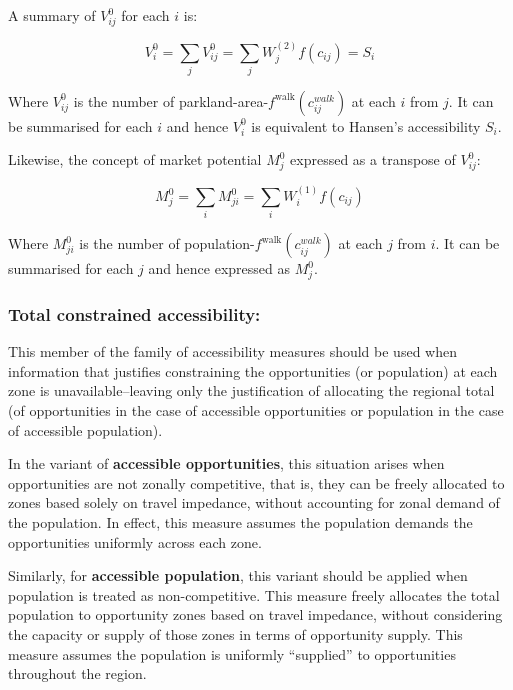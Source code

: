 \documentclass[
11pt, %
oneside, %
english, %
singlespacing, %
]{macthesis} %
\begin{document}
A summary of \(V_{ij}^0\) for each \(i\) is:

\begin{equation}
\label{eq:unconstrained-accessibility-park}
V^0_i = \sum_j V^0_{ij} = \sum_j W^{(2)}_j f(c_{ij}) = S_i
\end{equation} 

Where \(V^0_{ij}\) is the number of parkland-area-\(f^\text{walk}(c^{walk}_{ij})\) at each \(i\) from \(j\). It can be summarised for each \(i\) and hence \(V^0_i\) is equivalent to Hansen's accessibility \(S_i\).

Likewise, the concept of market potential \(M_j^0\) expressed as a transpose of \(V^0_{ij}\):

\begin{equation}
\label{eq:unconstrained-market-park}
M_j^0 = \sum_i M^0_{ji} = \sum_i W_i^{(1)} f(c_{ij})
\end{equation} 

Where \(M^0_{ji}\) is the number of population-\(f^\text{walk}(c^{walk}_{ij})\) at each \(j\) from \(i\). It can be summarised for each \(j\) and hence expressed as \(M^0_j\).

\subsubsection{Total constrained accessibility:}\label{total-constrained-accessibility-1}

This member of the family of accessibility measures should be used when information that justifies constraining the opportunities (or population) at each zone is unavailable--leaving only the justification of allocating the regional total (of opportunities in the case of accessible opportunities or population in the case of accessible population).

In the variant of \textbf{accessible opportunities}, this situation arises when opportunities are not zonally competitive, that is, they can be freely allocated to zones based solely on travel impedance, without accounting for zonal demand of the population. In effect, this measure assumes the population demands the opportunities uniformly across each zone.

Similarly, for \textbf{accessible population}, this variant should be applied when population is treated as non-competitive. This measure freely allocates the total population to opportunity zones based on travel impedance, without considering the capacity or supply of those zones in terms of opportunity supply. This measure assumes the population is uniformly ``supplied'' to opportunities throughout the region.
\end{document}
